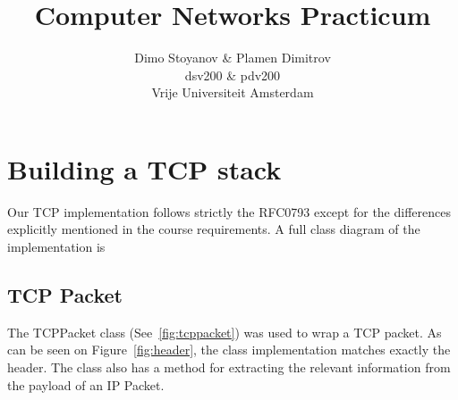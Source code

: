 \documentclass{article}
\title{	\textbf{Computer Networks Practicum}
		}
\author{
		Dimo Stoyanov \& Plamen Dimitrov\\
		dsv200 \& pdv200 \\
		Vrije Universiteit Amsterdam\\	
}
\begin{document}
\maketitle

\section{Building a TCP stack}
Our TCP implementation follows strictly the RFC0793 except for the differences explicitly
mentioned in the course requirements. A full class diagram of the implementation is 

\subsection{TCP Packet}
The TCPPacket class (See~\ref{fig:tcppacket}) was used to wrap a TCP packet. As can be seen
on Figure~\ref{fig:header}, the class implementation matches exactly the header. The class
also has a method for extracting the relevant information from the payload of an IP Packet.
\end{document}

